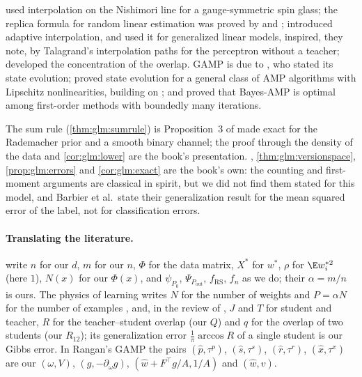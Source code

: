 \begin{refsection}
\Textcite{KoradaMacris2009} used interpolation on the Nishimori line for a gauge-symmetric spin glass; the replica formula for random linear estimation was proved by \textcite{ReevesPfister2016} and \textcite{BarbierMacrisDiaKrzakala2020}; \textcite{BarbierMacris2019} introduced adaptive interpolation, and \textcite{BarbierEtAl2019} used it for generalized linear models, inspired, they note, by Talagrand's interpolation paths for the perceptron without a teacher; \textcite{Barbier2021} developed the concentration of the overlap. GAMP is due to \textcite{Rangan2011}, who stated its state evolution; \textcite{JavanmardMontanari2013} proved state evolution for a general class of AMP algorithms with Lipschitz nonlinearities, building on \textcite{BayatiMontanari2011}; \textcite{CelentanoMontanariWu2020} and \textcite{MontanariWu2024} proved that Bayes-AMP is optimal among first-order methods with boundedly many iterations.

The sum rule (\cref{thm:glm:sumrule}) is Proposition~3 of \textcite{BarbierEtAl2019} made exact for the Rademacher prior and a smooth binary channel; the proof through the density of the data and \cref{cor:glm:lower} are the book's presentation. , \cref{thm:glm:versionspace}, \cref{prop:glm:errors} and \cref{cor:glm:exact} are the book's own: the counting and first-moment arguments are classical in spirit, but we did not find them stated for this model, and Barbier et al.\ state their generalization result for the mean squared error of the label, not for classification errors.

\paragraph{Translating the literature.} \Textcite{BarbierEtAl2019} write $n$ for our $d$, $m$ for our $n$, $\Phi$ for the data matrix, $X^*$ for $w^*$, $\rho$ for $\E w_i^{*2}$ (here $1$), $N(x)$ for our $\Phi(x)$, and $\psi_{P_0}$, $\Psi_{P_{\mathrm{out}}}$, $f_{\mathrm{RS}}$, $f_n$ as we do; their $\alpha=m/n$ is ours. The physics of learning writes $N$ for the number of weights and $P=\alpha N$ for the number of examples \parencite{SeungSompolinskyTishby1992}, and, in the review of \textcite{EngelVandenBroeck2001}, $J$ and $T$ for student and teacher, $R$ for the teacher--student overlap (our $Q$) and $q$ for the overlap of two students (our $R_{12}$); its generalization error $\frac1\pi\arccos R$ of a single student is our Gibbs error. In Rangan's GAMP the pairs $(\hat p,\tau^p)$, $(\hat s,\tau^s)$, $(\hat r,\tau^r)$, $(\hat x,\tau^x)$ are our $(\omega,V)$, $(g,-\partial_\omega g)$, $(\hat w+F^\top g/A,1/A)$ and $(\hat w,v)$.

\printchapterbib
\end{refsection}
